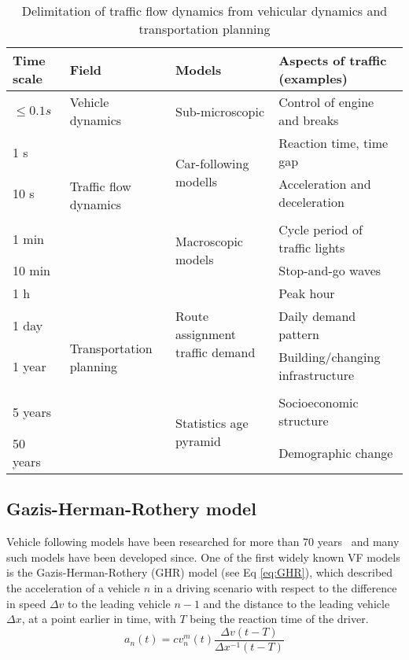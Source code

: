         \begin{table}[H]
            \centering
            \begin{tabular}{p{.1\linewidth} p{.2\linewidth} p{.2\linewidth} p{.4\linewidth}}
                \hline
                Time scale & Field & Models & Aspects of traffic (examples) \\ \hline \hline
                $\le 0.1 s$ & Vehicle dynamics & Sub-microscopic & Control of engine and breaks \\ \hline
                1 s & \multirow{4}{\linewidth}{Traffic flow dynamics}&\multirow{2}{\linewidth}{Car-following modells} & Reaction time, time gap \\
                10 s & & & Acceleration and deceleration \\\\
                1 min& & \multirow{2}{\linewidth}{Macroscopic models} & Cycle period of traffic lights \\
                10 min & & & Stop-and-go waves \\ \hline
                1 h & \multirow{5}{\linewidth}{Transportation planning} & \multirow{3}{\linewidth}{Route assignment traffic demand} & Peak hour \\
                1 day & & & Daily demand pattern \\
                1 year & & & Building/changing infrastructure \\\\
                5 years & &  \multirow{2}{\linewidth}{Statistics age pyramid} & Socioeconomic structure \\
                50 years & & & Demographic change \\ \hline

            \end{tabular}
            \caption{Delimitation of traffic flow dynamics from vehicular dynamics and transportation planning\cite{treiber2013traffic}}
            \label{tab:dilimination-of-traffic-flow-dynamics}
        \end{table}

        \subsection{Gazis-Herman-Rothery model}\label{subsec:gazis-herman-rothery-model}
            Vehicle following models have been researched for more than 70 years~\cite{pipes1953operational} and many such models have been developed since.
            One of the first widely known VF models is the Gazis-Herman-Rothery (GHR) model (see Eq \ref{eq:GHR}), which described the acceleration of a vehicle $n$ in a driving scenario with respect to the difference in speed $\Delta v$ to the leading vehicle $n-1$ and the distance to the leading vehicle $\Delta x$, at a point earlier in time, with $T$ being the reaction time of the driver\cite{Brackstone1999}.
            \begin{equation}
                a_n(t) = c v_n^m(t) \frac{\Delta v (t-T)}{\Delta x^{-1} (t-T)} \label{eq:GHR}
            \end{equation}

